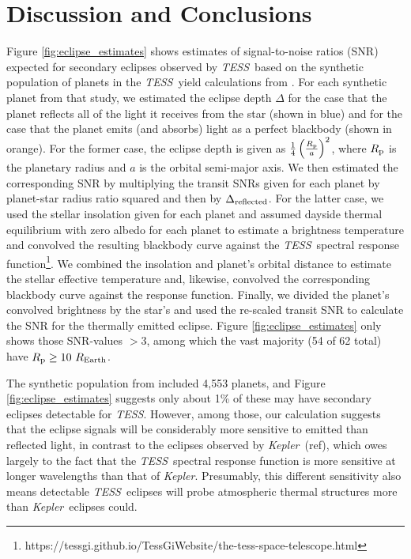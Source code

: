 \documentclass[manuscript]{aastex62}
\newcommand{\kepler}{{\it Kepler}}
\newcommand{\tess}{{\it TESS}}
\begin{document}
\section{Discussion and Conclusions}
Figure \ref{fig:eclipse_estimates} shows estimates of signal-to-noise ratios (SNR) expected for secondary eclipses observed by \tess\ based on the synthetic population of planets in the \tess\ yield calculations from \citet{2018arXiv180405050B}. For each synthetic planet from that study, we estimated the eclipse depth $\Delta$ for the case that the planet reflects all of the light it receives from the star (shown in blue) and for the case that the planet emits (and absorbs) light as a perfect blackbody (shown in orange). For the former case, the eclipse depth is given as $\frac{1}{4} \left( \frac{R_{\rm p}}{a} \right)^2$, where $R_{\rm p}$ is the planetary radius and $a$ is the orbital semi-major axis. We then estimated the corresponding SNR by multiplying the transit SNRs given for each planet by planet-star radius ratio squared and then by $\Delta_{\rm reflected}$. For the latter case, we used the stellar insolation given for each planet and assumed dayside thermal equilibrium with zero albedo for each planet to estimate a brightness temperature and convolved the resulting blackbody curve against the \tess\ spectral response function\footnote{https://tessgi.github.io/TessGiWebsite/the-tess-space-telescope.html}. We combined the insolation and planet's orbital distance to estimate the stellar effective temperature and, likewise, convolved the corresponding blackbody curve against the response function. Finally, we divided the planet's convolved brightness by the star's and used the re-scaled transit SNR to calculate the SNR for the thermally emitted eclipse. Figure \ref{fig:eclipse_estimates} only shows those SNR-values $> 3$, among which the vast majority (54 of 62 total) have $R_{\rm p} \geq 10\ R_{\rm Earth}$.

The synthetic population from \citet{2018arXiv180405050B} included 4,553 planets, and Figure \ref{fig:eclipse_estimates} suggests only about 1\% of these may have secondary eclipses detectable for \tess. However, among those, our calculation suggests that the eclipse signals will be considerably more sensitive to emitted than reflected light, in contrast to the eclipses observed by \kepler\ (ref), which owes largely to the fact that the \tess\ spectral response function is more sensitive at longer wavelengths than that of \kepler. Presumably, this different sensitivity also means detectable \tess\ eclipses will probe atmospheric thermal structures more than \kepler\ eclipses could.
\end{document}
